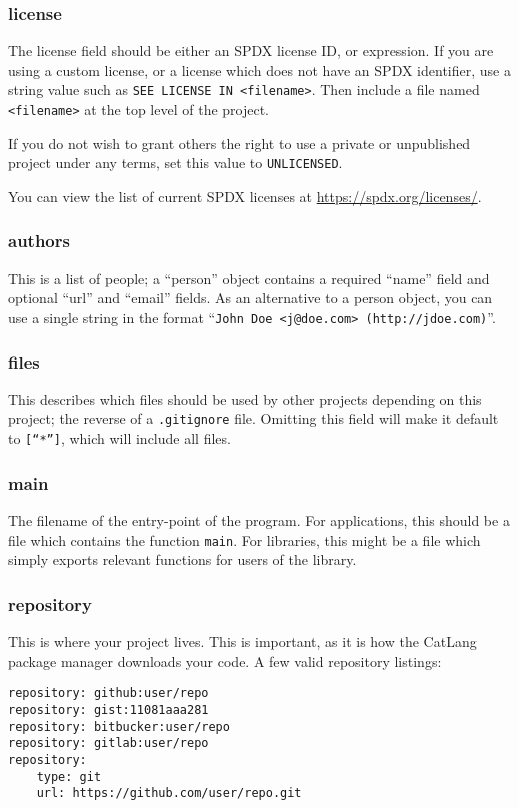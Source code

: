 \documentclass[12pt]{article}
\begin{document}
\subsubsection{license}
The license field should be either an SPDX license ID, or expression. If you are using a custom license, or a license which does not have an SPDX identifier, use a string value such as \texttt{SEE LICENSE IN <filename>}. Then include a file named \texttt{<filename>} at the top level of the project.

If you do not wish to grant others the right to use a private or unpublished project under any terms, set this value to \texttt{UNLICENSED}.

You can view the list of current SPDX licenses at \url{https://spdx.org/licenses/}.

\subsubsection{authors}
This is a list of people; a ``person'' object contains a required ``name'' field and optional ``url'' and ``email'' fields. As an alternative to a person object, you can use a single string in the format ``\texttt{John Doe <j@doe.com> (http://jdoe.com)}''.

\subsubsection{files}
This describes which files should be used by other projects depending on this project; the reverse of a \texttt{.gitignore} file. Omitting this field will make it default to \texttt{[``*'']}, which will include all files.

\subsubsection{main}
The filename of the entry-point of the program. For applications, this should be a file which contains the function \texttt{main}. For libraries, this might be a file which simply exports relevant functions for users of the library.

\subsubsection{repository}
This is where your project lives. This is important, as it is how the CatLang package manager downloads your code. A few valid repository listings:

\begin{lstlisting}
repository: github:user/repo
repository: gist:11081aaa281
repository: bitbucker:user/repo
repository: gitlab:user/repo
repository:
	type: git
	url: https://github.com/user/repo.git
\end{lstlisting}
\end{document}
